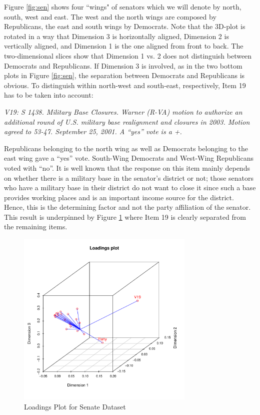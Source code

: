 \documentclass[article]{Z}
\begin{document}
Figure \ref{fig:sen} shows four ``wings" of senators which we will denote by north, south, west and east. The west and the north wings are composed by Republicans, the east and south wings by Democrats. Note that the 3D-plot is rotated in a way that Dimension 3 is horizontally aligned, Dimension 2 is vertically aligned, and Dimension 1 is the one aligned from front to back. The two-dimensional slices show that Dimension 1 vs. 2 does not distinguish between Democrats and Republicans. If Dimension 3 is involved, as in the two bottom plots in Figure \ref{fig:sen}, the separation between Democrats and Republicans is obvious. To distinguish within north-west and south-east, respectively, Item 19 has to be taken into account:

\emph{V19: S 1438. Military Base Closures. Warner (R-VA) motion to authorize an additional round of U.S. military base realignment and closures in 2003. Motion agreed to 53-47. September 25, 2001. A ``yes'' vote is a +.} 

Republicans belonging to the north wing as well as Democrats belonging to the east wing gave a ``yes'' vote. South-Wing Democrats and West-Wing Republicans voted with ``no''. It is well known that the response on this item mainly depends on whether there is a military base in the senator's district or not; those senators who have a military base in their district do not want to close it since such a base provides working places and is an important income source for the district. Hence, this is the determining factor and not the party affiliation of the senator. This result is underpinned by Figure \ref{fig:senload} where Item 19 is clearly separated from the remaining items.

\begin{figure}[h]
\begin{center}
\includegraphics[height=85mm, width=85mm]{senateload.pdf}
\caption{\label{fig:senload} Loadings Plot for Senate Dataset}
\end{center}
\end{figure}
\end{document}

